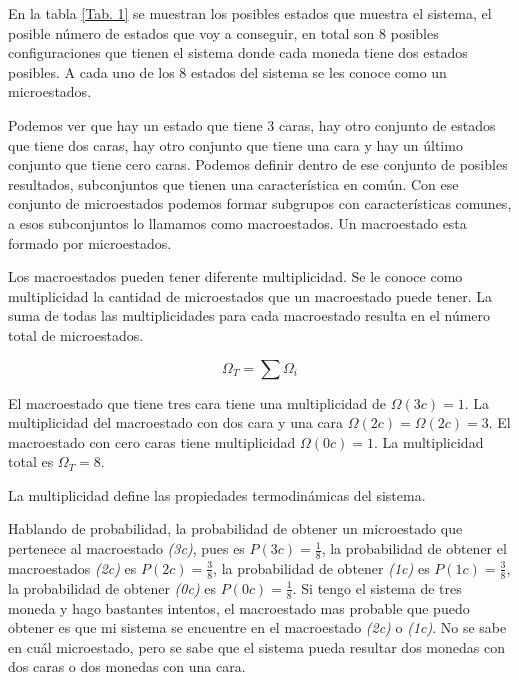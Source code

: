 \documentclass[11pt,fleqn]{book}
\begin{document}
En la tabla \ref{Tab. 1} se muestran los posibles estados que muestra el sistema, el posible número de estados que voy a conseguir, en total son 8 posibles configuraciones que tienen el sistema donde cada moneda tiene dos estados posibles. A cada uno de los 8 estados del sistema se les conoce como un microestados. 

Podemos ver que hay un estado que tiene 3 caras, hay otro conjunto de estados que tiene dos caras, hay otro conjunto que tiene una cara y hay un último conjunto que tiene cero caras. Podemos definir dentro de ese conjunto de posibles resultados, subconjuntos que tienen una característica en común. Con ese conjunto de microestados podemos formar subgrupos con características comunes, a esos subconjuntos lo llamamos como macroestados. Un macroestado esta formado por microestados. 

\begin{definition} 
Los macroestados pueden tener diferente multiplicidad. Se le conoce como multiplicidad la cantidad de microestados que un macroestado puede tener. La suma de todas las multiplicidades para cada macroestado resulta en el número total de microestados.

\begin{equation}
    \Omega_{T}=\sum\Omega_{i}
    \label{Eq. 2.1}
\end{equation}
\end{definition}

\begin{example}
El macroestado que tiene tres cara tiene una multiplicidad de $\Omega(3c)=1$. La multiplicidad del macroestado con dos cara y una cara $\Omega(2c)=\Omega(2c)=3$. El macroestado con cero caras tiene multiplicidad $\Omega(0c)=1$. La multiplicidad total es $\Omega_{T}=8$.

La multiplicidad define las propiedades termodinámicas del sistema.
\end{example}

Hablando de probabilidad, la probabilidad de obtener un microestado que pertenece al macroestado \textit{(3c)}, pues es $P(3c)=\frac{1}{8}$, la probabilidad de obtener el macroestados \textit{(2c)} es $P(2c)=\frac{3}{8}$, la probabilidad de obtener \textit{(1c)} es $P(1c)=\frac{3}{8}$, la probabilidad de obtener \textit{(0c)} es $P(0c)=\frac{1}{8}$. Si tengo el sistema de tres moneda y hago bastantes intentos, el macroestado mas probable que puedo obtener es que mi sistema se encuentre en el macroestado \textit{(2c)} o \textit{(1c)}. No se sabe en cuál microestado, pero se sabe que el sistema pueda resultar dos monedas con dos caras o dos monedas con una cara. 
\end{document}
